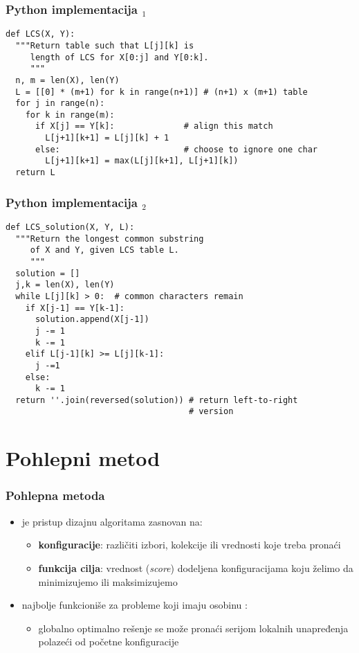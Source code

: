 \documentclass[compress,aspectratio=169]{beamer}
\begin{document}
\begin{frame}[fragile,shrink=10]
  \frametitle{Python implementacija $_1$}
\begin{verbatim}
def LCS(X, Y):
  """Return table such that L[j][k] is 
     length of LCS for X[0:j] and Y[0:k].
     """
  n, m = len(X), len(Y)                
  L = [[0] * (m+1) for k in range(n+1)] # (n+1) x (m+1) table
  for j in range(n):
    for k in range(m):
      if X[j] == Y[k]:              # align this match
        L[j+1][k+1] = L[j][k] + 1            
      else:                         # choose to ignore one char
        L[j+1][k+1] = max(L[j][k+1], L[j+1][k])
  return L
\end{verbatim}
\end{frame}

\begin{frame}[fragile,shrink=10]
  \frametitle{Python implementacija $_2$}
\begin{verbatim}
def LCS_solution(X, Y, L):
  """Return the longest common substring 
     of X and Y, given LCS table L.
     """
  solution = []
  j,k = len(X), len(Y)
  while L[j][k] > 0:  # common characters remain
    if X[j-1] == Y[k-1]:
      solution.append(X[j-1])
      j -= 1
      k -= 1
    elif L[j-1][k] >= L[j][k-1]:
      j -=1
    else:
      k -= 1
  return ''.join(reversed(solution)) # return left-to-right 
                                     # version
\end{verbatim}
\end{frame}

\section[Pohlepa]{Pohlepni metod}

\begin{frame}[fragile]
  \frametitle{Pohlepna metoda}
  \begin{itemize}
    \item {} je pristup dizajnu algoritama zasnovan
    na:
    \begin{itemize}
      \item \textbf{konfiguracije}: različiti izbori, kolekcije ili 
      vrednosti koje treba pronaći
      \item \textbf{funkcija cilja}: vrednost (\textit{score}) dodeljena
      konfiguracijama koju želimo da minimizujemo ili maksimizujemo
    \end{itemize}
    \item najbolje funkcioniše za probleme koji imaju osobinu 
    :
    \begin{itemize}
      \item globalno optimalno rešenje se može pronaći serijom lokalnih 
      unapređenja polazeći od početne konfiguracije
    \end{itemize}
  \end{itemize}
\end{frame}
\end{document}
